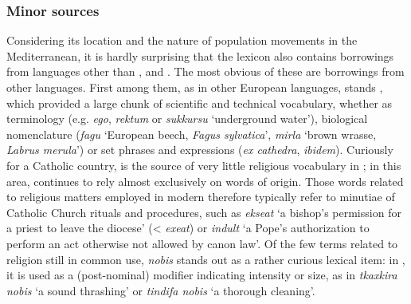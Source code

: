 \documentclass[output=paper]{langsci/langscibook}
\begin{document}
\subsubsection{Minor sources}

Considering its location and the nature of population movements in the Mediterranean, it is hardly surprising that the  lexicon also contains borrowings from languages other than ,  and . %
The most obvious of these are borrowings from other  languages. First among them, as in other European languages, stands , which provided a large chunk of  scientific and technical vocabulary, whether as terminology (e.g. \textit{ego},  \textit{rektum} or  \textit{sukkursu} `underground water'), biological nomenclature (\textit{fagu} `European beech, \textit{Fagus sylvatica}', \textit{mirla} `brown wrasse, \textit{Labrus merula}') or set phrases and expressions (\textit{ex cathedra}, \textit{ibidem}). Curiously for a Catholic country,  is the source of very little religious vocabulary in ; in this area,  continues to rely almost exclusively on words of  origin. Those  words related to religious matters employed in modern  therefore typically refer to minutiae of Catholic Church rituals and procedures, such as \textit{ekseat} `a bishop's permission for a priest to leave the diocese' (< \textit{exeat}) or \textit{indult} `a Pope's authorization to perform an act otherwise not allowed by canon law'. Of the few  terms related to religion still in common use, \textit{nobis} stands out as a rather curious lexical item: in , it is used as a (post-nominal) modifier indicating intensity or size, as in \textit{tkaxkira nobis} `a sound thrashing' or \textit{tindifa nobis} `a thorough cleaning'.
\end{document}
